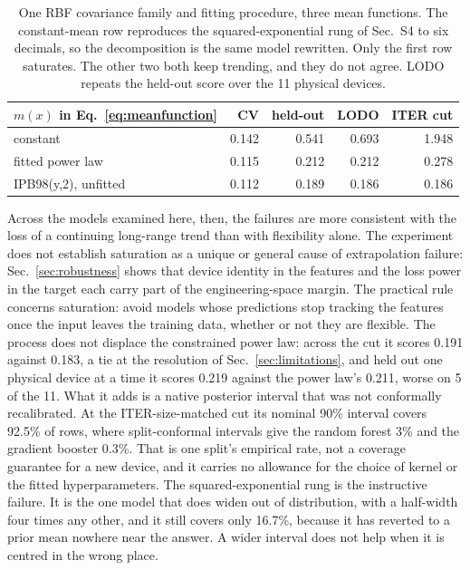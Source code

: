 \documentclass[aip,pop,preprint,amsmath,amssymb]{revtex4-2}
\begin{document}
\begin{table}[t]
\caption{One RBF covariance family and fitting procedure, three mean functions.
The constant-mean row reproduces the squared-exponential rung of Sec.~S4 to six
decimals, so the decomposition is the same model rewritten. Only the first row
saturates. The other two both keep trending, and they do not agree. LODO repeats
the held-out score over the 11 physical devices.}
\begin{ruledtabular}
\begin{tabular}{lrrrr}
$m(x)$ in Eq.~\eqref{eq:meanfunction} & CV & held-out & LODO & ITER cut \\
\hline
constant & 0.142 & 0.541 & 0.693 & 1.948 \\
fitted power law & 0.115 & 0.212 & 0.212 & 0.278 \\
IPB98(y,2), unfitted & 0.112 & 0.189 & 0.186 & 0.186 \\
\end{tabular}
\end{ruledtabular}
\label{tab:meanfunction}
\end{table}

Across the models examined here, then, the failures are more consistent with
the loss of a continuing long-range trend than with flexibility alone. The
experiment does not establish saturation as a unique or general cause of
extrapolation failure: Sec.~\ref{sec:robustness} shows that device identity in
the features and the loss power in the target each carry part of the
engineering-space margin. The practical rule concerns saturation: avoid models
whose predictions stop tracking the features once the input leaves the
training data, whether or not they are flexible. The
process does not displace the constrained power law: across the cut it scores
0.191 against 0.183, a tie at the resolution of Sec.~\ref{sec:limitations}, and
held out one physical device at a time it scores 0.219 against the power law's
0.211, worse on 5 of the 11. What it adds is a native posterior interval that
was not conformally recalibrated. At the ITER-size-matched cut its nominal
90\% interval covers 92.5\% of rows, where split-conformal intervals give the
random forest 3\% and the gradient booster 0.3\%. That is one split's empirical
rate, not a coverage guarantee for a new device, and it carries no allowance
for the choice of kernel or the fitted hyperparameters. The
squared-exponential rung is the
instructive failure. It is the one model that does widen out of distribution,
with a half-width four times any other, and it still covers only 16.7\%,
because it has reverted to a prior mean nowhere near the answer. A wider
interval does not help when it is centred in the wrong place.
\end{document}

